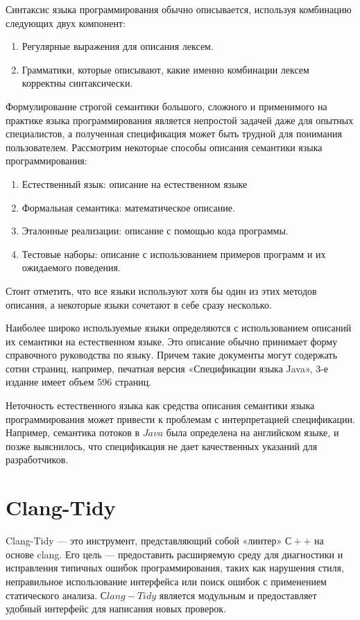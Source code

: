 \documentclass{mipt-thesis-bs}
\begin{document}
Синтаксис языка программирования обычно описывается, используя комбинацию следующих двух компонент:
\begin{enumerate}
    \item Регулярные выражения для описания лексем.
    \item Грамматики, которые описывают, какие именно комбинации лексем
    корректны синтаксически.
\end{enumerate}

Формулирование строгой семантики большого, сложного и применимого на практике языка 
программирования является непростой задачей даже для опытных специалистов, 
а полученная спецификация может быть трудной для понимания пользователем.
Рассмотрим некоторые способы описания семантики языка 
программирования:
\begin{enumerate}
    \item Естественный язык: описание на естественном языке
    \item Формальная семантика: математическое описание.
    \item Эталонные реализации: описание с помощью кода программы.
    \item Тестовые наборы: описание с использованием примеров программ
    и их ожидаемого поведения.
\end{enumerate}

Стоит отметить, что все языки используют хотя бы один из этих методов 
описания, а некоторые языки сочетают в себе сразу несколько.

Наиболее широко используемые языки определяются с использованием описаний 
их семантики на естественном языке. Это описание обычно принимает форму 
справочного руководства по языку. Причем такие документы могут содержать сотни 
страниц, например, печатная версия «Спецификации языка Java», 3-е издание имеет объем 596 страниц.

Неточность естественного языка как средства описания семантики 
языка программирования может привести к проблемам с интерпретацией 
спецификации. Например, семантика потоков в $Java$ была определена на 
английском языке, и позже выяснилось, что спецификация не дает 
качественных указаний для разработчиков.

\section{Clang-Tidy}

Clang-Tidy — это инструмент, представляющий собой «линтер» $С++$ на основе clang.
Его цель — предоставить расширяемую среду для диагностики и 
исправления типичных ошибок 
программирования, таких как нарушения стиля, неправильное использование 
интерфейса или поиск ошибок с применением статического 
анализа. $Сlang-Tidy$ является модульным и предоставляет удобный 
интерфейс для написания новых проверок.
\end{document}
